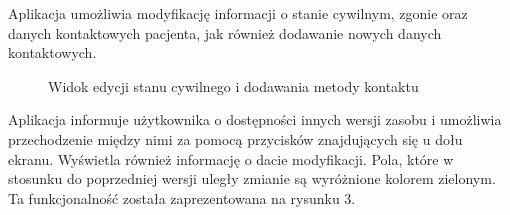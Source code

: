\documentclass[a4paper]{article}
\begin{document}
Aplikacja umożliwia modyfikację informacji o stanie cywilnym, zgonie oraz danych kontaktowych pacjenta, jak również dodawanie nowych danych kontaktowych.
\begin{figure}[H]
    \caption{Widok edycji stanu cywilnego i dodawania metody kontaktu}
\end{figure}

Aplikacja informuje użytkownika o dostępności innych wersji zasobu i umożliwia przechodzenie między nimi 
za pomocą przycisków znajdujących się u dołu ekranu. Wyświetla również informację o dacie modyfikacji.
Pola, które w stosunku do poprzedniej wersji uległy zmianie są wyróżnione kolorem zielonym.
Ta funkcjonalność została zaprezentowana na rysunku 3.
\end{document}
